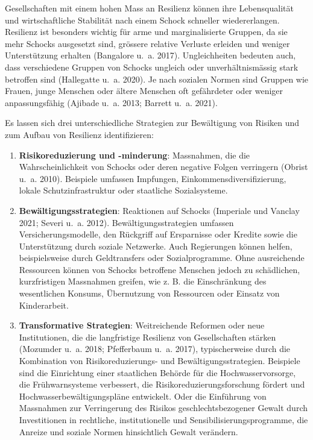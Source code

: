 \documentclass[
  nswissgerman,
  a4paper,
  openany]{book}
\begin{document}
Gesellschaften mit einem hohen Mass an Resilienz können ihre
Lebensqualität und wirtschaftliche Stabilität nach einem Schock
schneller wiedererlangen. Resilienz ist besonders wichtig für arme und
marginalisierte Gruppen, da sie mehr Schocks ausgesetzt sind, grössere
relative Verluste erleiden und weniger Unterstützung erhalten (Bangalore
u.~a. 2017). Ungleichheiten bedeuten auch, dass verschiedene Gruppen von
Schocks ungleich oder unverhältnismässig stark betroffen sind
(Hallegatte u.~a. 2020). Je nach sozialen Normen sind Gruppen wie
Frauen, junge Menschen oder ältere Menschen oft gefährdeter oder weniger
anpassungsfähig (Ajibade u.~a. 2013; Barrett u.~a. 2021).

Es lassen sich drei unterschiedliche Strategien zur Bewältigung von
Risiken und zum Aufbau von Resilienz identifizieren:

\begin{enumerate}
\def\labelenumi{\arabic{enumi}.}
\item
  \textbf{Risikoreduzierung und -minderung}: Massnahmen, die die
  Wahrscheinlichkeit von Schocks oder deren negative Folgen verringern
  (Obrist u.~a. 2010). Beispiele umfassen Impfungen,
  Einkommensdiversifizierung, lokale Schutzinfrastruktur oder staatliche
  Sozialsysteme.
\item
  \textbf{Bewältigungsstrategien}: Reaktionen auf Schocks (Imperiale und
  Vanclay 2021; Severi u.~a. 2012). Bewältigungsstrategien umfassen
  Versicherungsmodelle, den Rückgriff auf Ersparnisse oder Kredite sowie
  die Unterstützung durch soziale Netzwerke. Auch Regierungen können
  helfen, beispielsweise durch Geldtransfers oder Sozialprogramme. Ohne
  ausreichende Ressourcen können von Schocks betroffene Menschen jedoch
  zu schädlichen, kurzfristigen Massnahmen greifen, wie z. B. die
  Einschränkung des wesentlichen Konsums, Übernutzung von Ressourcen
  oder Einsatz von Kinderarbeit.
\item
  \textbf{Transformative Strategien}: Weitreichende Reformen oder neue
  Institutionen, die die langfristige Resilienz von Gesellschaften
  stärken (Mozumder u.~a. 2018; Pfefferbaum u.~a. 2017), typischerweise
  durch die Kombination von Risikoreduzierungs- und
  Bewältigungsstrategien. Beispiele sind die Einrichtung einer
  staatlichen Behörde für die Hochwasservorsorge, die Frühwarnsysteme
  verbessert, die Risikoreduzierungsforschung fördert und
  Hochwasserbewältigungspläne entwickelt. Oder die Einführung von
  Massnahmen zur Verringerung des Risikos geschlechtsbezogener Gewalt
  durch Investitionen in rechtliche, institutionelle und
  Sensibilisierungsprogramme, die Anreize und soziale Normen
  hinsichtlich Gewalt verändern.
\end{enumerate}
\end{document}
